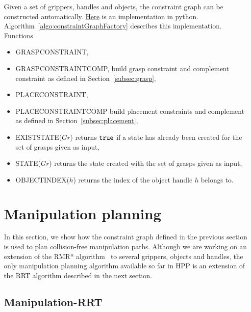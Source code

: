 Given a set of grippers, handles and objects, the constraint graph can be constructed automatically. \href{https://github.com/humanoid-path-planner/hpp-manipulation-corba/blob/5af1b3bad68e8c339d5f42eb72173d7356504532/src/hpp/corbaserver/manipulation/constraint_graph_factory.py\#L187}{Here} is an implementation in python. Algorithm~\ref{algo:constraintGraphFactory} describes this implementation.
Functions
\begin{itemize}
\item {\scriptsize GRASP}{\small C}{\scriptsize ONSTRAINT},
\item {\scriptsize GRASP}{\small C}{\scriptsize ONSTRAINT}{\small C}{\scriptsize OMP}, build grasp constraint and complement constraint as defined in Section~\ref{subsec:grasp},
\item {\scriptsize PLACE}{\small C}{\scriptsize ONSTRAINT},
\item {\scriptsize PLACE}{\small C}{\scriptsize ONSTRAINT}{\small C}{\scriptsize OMP} build placement constraints and complement as defined in Section~\ref{subsec:placement},
\item {\scriptsize EXIST}{\small S}{\scriptsize TATE}($Gr$) returns $\texttt{true}$ if a state has already been created for the set of grasps given as input,
\item{\scriptsize STATE}($Gr$) returns the state created with the set of grasps given as input,
\item {\scriptsize OBJECT}{\small I}{\scriptsize NDEX}($h$) returns the index of the object handle $h$ belongs to.
\end{itemize}

\section{Manipulation planning}\label{sec:manipulation-planning}

In this section, we show how the constraint graph defined in the previous section is used to plan collision-free manipulation paths. Although we are working on an extension of the RMR* algorithm~\cite{schmitt17icra} to several grippers, objects and handles, the only manipulation planning algorithm available so far in HPP is an extension of the RRT algorithm described in the next section.

\subsection{Manipulation-RRT}

